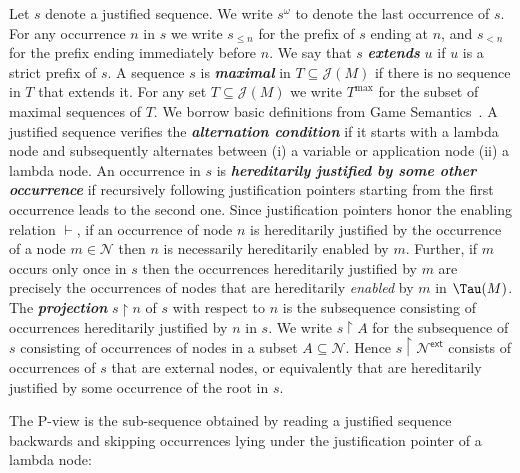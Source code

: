 \documentclass[xchauthor,chkrefs,GCNS,amsmath,amsthm,rotating,leaveRGB]{tcsg}
\renewcommand{\index}[1]{}
\theoremstyle{plain}
\theoremstyle{definition}
\newcommand{\Nodes}{\mathcal{N}}
\newcommand{\enables}{\vdash}
\newcommand{\ctree}{\Tau}
\newcommand{\ExternalNodes}{\Nodes^{\mathsf{ext}}}
\def\justseqset{\mathcal{J}}
\begin{document}
Let $s$ denote a justified sequence. We write $s^\omega $ to denote the last
occurrence of $s$. For any occurrence $n$ in $s$ we write $s_{\leq n}$ for
the prefix of $s$ ending at $n$, and $s_{<n}$ for the prefix ending
immediately before $n$. We say that $s$
\textbf{\emph{extends}}\index{extends} $u$ if $u$ is a strict prefix of $s$.
A sequence $s$ is \textbf{\emph{maximal}}\index{maximal} in $T\subseteq
\justseqset (M)$ if there is no sequence in $T$ that extends it. For any set
$T\subseteq \justseqset (M)$ we write $T^{\max }$ for the subset of maximal
sequences of $T$. We borrow basic definitions from Game
Semantics~\cite{Abr02}. A justified sequence verifies the
\textbf{\emph{alternation condition}}\index{alternation condition} if it
starts with a lambda node and subsequently alternates between (i) a variable
or application node (ii) a lambda node. An occurrence in $s$ is
\textbf{\emph{hereditarily justified by some other
occurrence}}\index{hereditarily justified by some other occurrence} if
recursively following justification pointers starting from the first
occurrence leads to the second one. Since justification pointers honor the
enabling relation $\enables $, if an occurrence of node $n$ is hereditarily
justified by the occurrence of a node $m\in \Nodes $ then $n$ is necessarily
hereditarily enabled by $m$. Further, if $m$ occurs only once in $s$ then the
occurrences hereditarily justified by $m$ are precisely the occurrences of
nodes that are hereditarily \emph{enabled} by $m$ in $\ctree (M)$. The
\textbf{\emph{projection}}\index{projection} $s\upharpoonright  n$ of $s$
with respect to $n$ is the subsequence consisting of occurrences hereditarily
justified by $n$ in $s$. We write $s \upharpoonright  A$ for the subsequence
of $s$ consisting of occurrences of nodes in a subset $A \subseteq \Nodes $.
Hence $s\upharpoonright  \ExternalNodes $ consists of occurrences of $s$ that
are external nodes, or equivalently that are hereditarily justified by some
occurrence of the root in $s$.

The P-view is the sub-sequence obtained by reading a justified sequence
backwards and skipping occurrences lying under the justification pointer of a
lambda node:
\end{document}
